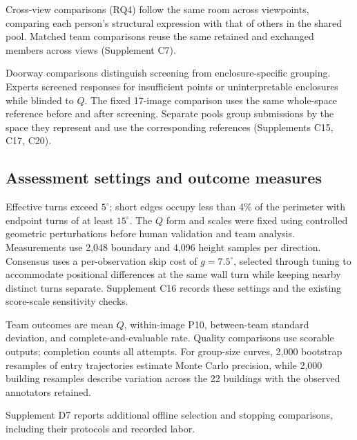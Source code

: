 Cross-view comparisons (RQ4) follow the same room across viewpoints, comparing each person's structural expression with that of others in the shared pool. Matched team comparisons reuse the same retained and exchanged members across views (Supplement C7).

Doorway comparisons distinguish screening from enclosure-specific grouping. Experts screened responses for insufficient points or uninterpretable enclosures while blinded to $Q$. The fixed 17-image comparison uses the same whole-space reference before and after screening. Separate pools group submissions by the space they represent and use the corresponding references (Supplements C15, C17, C20).

\subsection{Assessment settings and outcome measures}
\label{sec:method-assessment}

Effective turns exceed $5^\circ$; short edges occupy less than 4\% of the perimeter with endpoint turns of at least $15^\circ$. The $Q$ form and scales were fixed using controlled geometric perturbations before human validation and team analysis. Measurements use 2,048 boundary and 4,096 height samples per direction. Consensus uses a per-observation skip cost of $g=7.5^\circ$, selected through tuning to accommodate positional differences at the same wall turn while keeping nearby distinct turns separate. Supplement C16 records these settings and the existing score-scale sensitivity checks.

Team outcomes are mean $Q$, within-image P10, between-team standard deviation, and complete-and-evaluable rate. Quality comparisons use scorable outputs; completion counts all attempts. For group-size curves, 2,000 bootstrap resamples of entry trajectories estimate Monte Carlo precision, while 2,000 building resamples describe variation across the 22 buildings with the observed annotators retained.

Supplement D7 reports additional offline selection and stopping comparisons, including their protocols and recorded labor.

